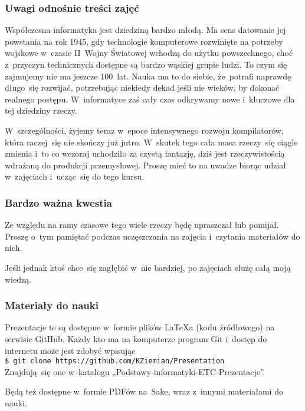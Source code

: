\documentclass[10pt,t]{beamer}
\begin{document}
\begin{frame}
  \frametitle{Uwagi odnośnie treści zajęć}


  Współczesna informatyka jest dziedziną bardzo młodą. Ma sens datowanie
  jej powstania na rok 1945, gdy technologie komputerowe rozwinięte na
  potrzeby wojskowe w~czasie II~Wojny Światowej wchodzą do użytku
  powszechnego, choć z~przyczyn technicznych dostępne są bardzo wąskiej
  grupie ludzi. To czym się zajmujemy nie ma jeszcze 100~lat. Nauka ma to
  do siebie, że~potrafi naprawdę długo~się rozwijać, potrzebując niekiedy
  dekad jeśli nie wieków, by dokonać realnego postępu. W~informatyce zaś
  cały czas odkrywamy nowe i~kluczowe dla tej dziedziny rzeczy.

  W~szczególności, żyjemy teraz w~epoce intensywnego rozwoju kompilatorów,
  która raczej~się nie skończy już jutro. W~skutek tego cała masa rzeczy~się
  ciągle zmienia i~to co wczoraj uchodziło za czystą fantazję, dziś jest
  rzeczywistością wdrażaną do produkcji przemysłowej. Proszę mieć to na
  uwadze biorąc udział w~zajęciach i~ucząc~się do tego kursu.

\end{frame}





\begin{frame}
  \frametitle{Bardzo ważna kwestia}


  Ze względu na ramy czasowe tego wiele rzeczy będę \alert{upraszczał} lub
  \alert{pomijał}. Proszę o~tym pamiętać podczas uczęszczania na zajęcia
  i~czytania materiałów do nich.

  Jeśli jednak ktoś chce~się zagłębić w~nie bardziej, po zajęciach służę
  całą moją wiedzą.

\end{frame}





\begin{frame}
  \frametitle{Materiały do nauki}


  Prezentacje te są dostępne w~formie plików \LaTeX a (kodu źródłowego)
  na serwisie GitHub. Każdy kto ma na komputerze program Git i~dostęp
  do internetu może jest zdobyć wpisując \\
  \texttt{\$ git clone https://github.com/KZiemian/Presentation} \\
  Znajdują~się one w~katalogu „Podstawy-informatyki-ETC-Prezentacje”.

  Będą też dostępne w~formie PDFów na~Sake, wraz z~innymi materiałami
  do nauki.

\end{frame}
\end{document}
